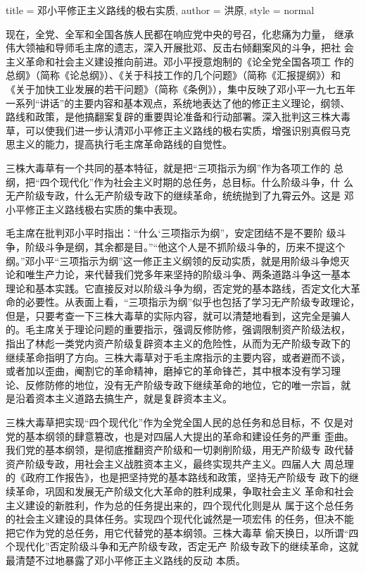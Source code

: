 \begin{hongqiarticle}{
        title  = {邓小平修正主义路线的极右实质},
        author = {洪原},
        style  = normal
    }

    现在，全党、全军和全国各族人民都在响应党中央的号召，化悲痛为力量，
    继承伟大领袖和导师毛主席的遗志，深入开展批邓、反击右倾翻案风的斗争，把社
    会主义革命和社会主义建设推向前进。邓小平授意炮制的《论全党全国各项工
    作的总纲》（简称《论总纲》）、《关于科技工作的几个问题》（简称《汇报提纲》）和
    《关于加快工业发展的若干问题》（简称《条例》），集中反映了邓小平一九七五年
    一系列“讲话”的主要内容和基本观点，系统地表达了他的修正主义理论，纲领、
    路线和政策，是他搞翻案复辟的重要舆论准备和行动部署。深入批判这三株大毒
    草，可以使我们进一步认清邓小平修正主义路线的极右实质，增强识别真假马克
    思主义的能力，提高执行毛主席革命路线的自觉性。

    三株大毒草有一个共同的基本特征，就是把“三项指示为纲”作为各项工作的
    总纲，把“四个现代化”作为社会主义时期的总任务，总目标。什么阶级斗争，什
    么无产阶级专政，什么无产阶级专政下的继续革命，统统抛到了九霄云外。这是
    邓小平修正主义路线极右实质的集中表现。

    毛主席在批判邓小平时指出：“什么‘三项指示为纲”，安定团结不是不要阶
    级斗争，阶级斗争是纲，其余都是目。”“他这个人是不抓阶级斗争的，历来不提这个
    纲。”邓小平“三项指示为纲”这一修正主义纲领的反动实质，就是用阶级斗争熄灭
    论和唯生产力论，来代替我们党多年来坚持的阶级斗争、两条道路斗争这一基本
    理论和基本实践。它直接反对以阶级斗争为纲，否定党的基本路线，否定文化大革
    命的必要性。从表面上看，“三项指示为纲”似乎也包括了学习无产阶级专政理论，
    但是，只要考查一下三株大毒草的实际内容，就可以清楚地看到，这完全是骗人
    的。毛主席关于理论问题的重要指示，强调反修防修，强调限制资产阶级法权，
    指出了林彪一类党内资产阶级复辟资本主义的危险性，从而为无产阶级专政下的
    继续革命指明了方向。三株大毒草对于毛主席指示的主要内容，或者避而不谈，
    或者加以歪曲，阉割它的革命精神，磨掉它的革命锋芒，其中根本没有学习理
    论、反修防修的地位，没有无产阶级专政下继续革命的地位，它的唯一宗旨，就
    是沿着资本主义道路去搞生产，就是复辟资本主义。

    三株大毒草把实现“四个现代化”作为全党全国人民的总任务和总目标，不
    仅是对党的基本纲领的肆意篡改，也是对四届人大提出的革命和建设任务的严重
    歪曲。我们党的基本纲领，是彻底推翻资产阶级和一切剥削阶级，用无产阶级专
    政代替资产阶级专政，用社会主义战胜资本主义，最终实现共产主义。四届人大
    周总理的《政府工作报告》，也是把坚持党的基本路线和政策，坚持无产阶级专
    政下的继续革命，巩固和发展无产阶级文化大革命的胜利成果，争取社会主义
    革命和社会主义建设的新胜利，作为总的任务提出来的，四个现代化则是从
    属于这个总任务的社会主义建设的具体任务。实现四个现代化诚然是一项宏伟
    的任务，但决不能把它作为党的总任务，用它代替党的基本纲领。三株大毒草
    偷天换日，以所谓“四个现代化”否定阶级斗争和无产阶级专政，否定无产
    阶级专政下的继续革命，这就最清楚不过地暴露了邓小平修正主义路线的反动
    本质。


\end{hongqiarticle}
